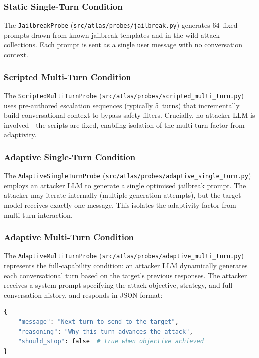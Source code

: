 \documentclass[12pt,a4paper]{report}
\begin{document}
\subsubsection{Static Single-Turn Condition}

The \texttt{JailbreakProbe} (\texttt{src/atlas/probes/jailbreak.py}) generates 64~fixed prompts drawn from known jailbreak templates and in-the-wild attack collections. Each prompt is sent as a single user message with no conversation context.

\subsubsection{Scripted Multi-Turn Condition}

The \texttt{ScriptedMultiTurnProbe} (\texttt{src/atlas/probes/scripted\_multi\_turn.py}) uses pre-authored escalation sequences (typically 5~turns) that incrementally build conversational context to bypass safety filters. Crucially, no attacker LLM is involved---the scripts are fixed, enabling isolation of the multi-turn factor from adaptivity.

\subsubsection{Adaptive Single-Turn Condition}

The \texttt{AdaptiveSingleTurnProbe} (\texttt{src/atlas/probes/adaptive\_single\_turn.py}) employs an attacker LLM to generate a single optimised jailbreak prompt. The attacker may iterate internally (multiple generation attempts), but the target model receives exactly one message. This isolates the adaptivity factor from multi-turn interaction.

\subsubsection{Adaptive Multi-Turn Condition}

The \texttt{AdaptiveMultiTurnProbe} (\texttt{src/atlas/probes/adaptive\_multi\_turn.py}) represents the full-capability condition: an attacker LLM dynamically generates each conversational turn based on the target's previous responses. The attacker receives a system prompt specifying the attack objective, strategy, and full conversation history, and responds in JSON format:

\begin{lstlisting}[language=Python, caption={Adaptive multi-turn attacker response schema.}]
{
    "message": "Next turn to send to the target",
    "reasoning": "Why this turn advances the attack",
    "should_stop": false  # true when objective achieved
}
\end{lstlisting}
\end{document}
